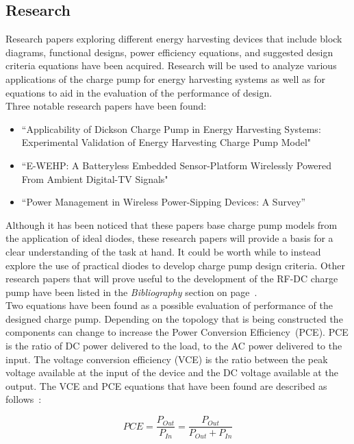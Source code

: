 \documentclass[12pt]{article}
\begin{document}
	\subsection{Research}
	Research papers exploring different energy harvesting devices that include block diagrams, functional designs, power efficiency equations, and suggested design criteria equations have been acquired. Research will be used to analyze various applications of the charge pump for energy harvesting systems as well as for equations to aid in the evaluation of the performance of design.\\
	
	\noindent Three notable research papers have been found:
	\begin{itemize}
	\item ``Applicability of Dickson Charge Pump in Energy Harvesting Systems: Experimental Validation of Energy Harvesting Charge Pump Model" \cite{Vinco}
	\item ``E-WEHP: A Batteryless Embedded Sensor-Platform Wirelessly Powered From Ambient Digital-TV Signals" \cite{Vyas}
	\item ``Power Management in Wireless Power-Sipping Devices: A Survey” \cite{Guler}
	\end{itemize} 
	\vspace{0.5em}

	\noindent Although it has been noticed that these papers base charge pump models from the application of ideal diodes, these research papers will provide a basis for a clear understanding of the task at hand. It could be worth while to instead explore the use of practical diodes to develop charge pump design criteria. Other research papers that will prove useful to the development of the RF-DC charge pump have been listed in the \textit{Bibliography} section on page~\pageref{bibliography}.\\
	
	\noindent Two equations have been found as a possible evaluation of performance of the designed charge pump. Depending on the topology that is being constructed the components can change to increase the Power Conversion Efficiency~(PCE). PCE is the ratio of DC power delivered to the load, to the AC power delivered to the input. The voltage conversion efficiency (VCE) is the ratio between the peak voltage available at the input of the device and the DC voltage available at the output. The VCE and PCE equations that have been found are described as follows~\cite{Guler}:

\begin{equation}
PCE = \frac{P_{Out}}{P_{In}} = \frac{P_{Out}}{P_{Out} + P_{In}}\label{eq:PCE}
\end{equation}
\vspace{1em}
\end{document}
